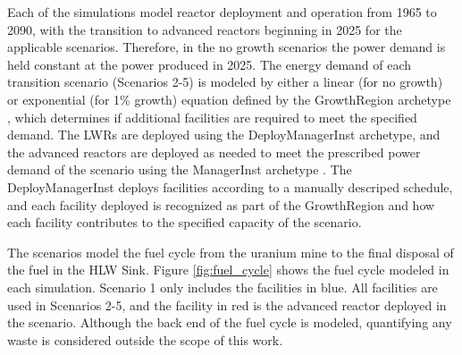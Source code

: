 Each of the simulations model reactor deployment and operation from 1965 to 
2090, with the transition to advanced reactors beginning 
in 2025 for the applicable scenarios. Therefore, in the no growth scenarios 
the power demand is held constant 
at the power produced in 2025. The energy demand of each transition scenario 
(Scenarios 2-5) is modeled by either a linear (for no growth) or 
exponential (for 1\% growth) equation defined by the \Cycamore GrowthRegion
archetype \cite{huff_fundamental_2016}, which determines if additional 
facilities are required to meet the specified demand. The \glspl{LWR} are deployed 
using the \Cycamore DeployManagerInst archetype, and the 
advanced reactors are deployed as needed to meet the prescribed power demand 
of the scenario using the \Cycamore ManagerInst archetype 
\cite{huff_fundamental_2016}. The \Cycamore DeployManagerInst deploys facilities 
according to a manually descriped schedule, and each facility deployed is 
recognized as part of the \Cycamore GrowthRegion and how each facility contributes 
to the specified capacity of the scenario. 

The scenarios model the fuel cycle from the uranium mine to the final 
disposal of the fuel in the HLW Sink.  Figure 
\ref{fig:fuel_cycle} shows the fuel cycle modeled in each simulation. Scenario 
1 only includes the facilities in blue. All facilities are used in Scenarios 
2-5, and the facility in red is the advanced reactor deployed in the 
scenario. Although the back end of the fuel 
cycle is modeled, quantifying any waste is considered outside the 
scope of this work. 

